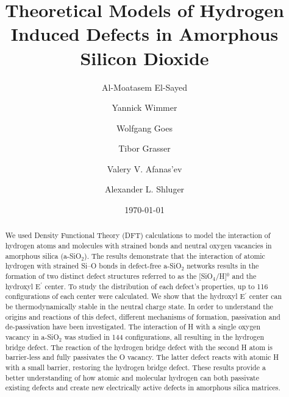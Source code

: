 \documentclass[aps,prb,reprint,superscriptaddress,showpacs]{revtex4-1}
\begin{document}
\title{Theoretical Models of Hydrogen Induced Defects in Amorphous Silicon Dioxide}
    
\author{Al-Moatasem El-Sayed}
\author{Yannick Wimmer}
\author{Wolfgang Goes}
\author{Tibor Grasser}
\author{Valery V. Afanas'ev}
\author{Alexander L. Shluger}

\date{\today}
\begin{abstract}
We used Density Functional Theory (DFT) calculations to model the interaction of hydrogen atoms and molecules with strained bonds and neutral oxygen vacancies in amorphous silica (a-SiO$_2$). The results demonstrate that the interaction of atomic hydrogen with strained \mbox{Si--O} bonds in defect-free a-SiO$_2$ networks results in the formation of two distinct defect structures referred to as the [SiO$_4$/H]$^0$ and the hydroxyl E$^\prime$ center. To study the distribution of each defect's properties, up to 116 configurations of each center were calculated. We show that the hydroxyl E$^\prime$ center can be thermodynamically stable in the neutral charge state. In order to understand the origins and reactions of this defect, different mechanisms of formation, passivation and de-passivation have been investigated. The interaction of H with a single oxygen vacancy in a-SiO$_2$ was studied in 144 configurations, all resulting in the hydrogen bridge defect. The reaction of the hydrogen bridge defect with the second H atom is barrier-less and fully passivates the O vacancy. The latter defect reacts with atomic H with a small barrier, restoring the hydrogen bridge defect. These results provide a better understanding of how atomic and molecular hydrogen can both passivate existing defects and create new electrically active defects in amorphous silica matrices.

\end{abstract}
\end{document}
